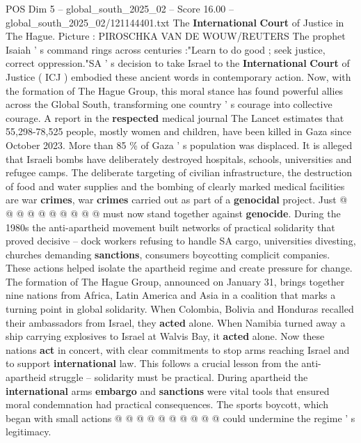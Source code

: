\begin{textsample}{POS Dim 5 – global\_south\_2025\_02 – Score 16.00 – global\_south\_2025\_02/121144401.txt}  \label{ex:f5_pos_148}
The \textbf{International} \textbf{Court} of Justice in The Hague.
Picture : PIROSCHKA VAN DE WOUW/REUTERS The prophet Isaiah ' s command rings across centuries :"Learn to do good ; seek justice, correct oppression."SA ' s decision to take Israel to the \textbf{International} \textbf{Court} of Justice ( ICJ ) embodied these ancient words in contemporary action.
Now, with the formation of The Hague Group, this moral stance has found powerful allies across the Global South, transforming one country ' s courage into collective courage.
A report in the \textbf{respected} medical journal The Lancet estimates that 55,298-78,525 people, mostly women and children, have been killed in Gaza since October 2023.
More than 85 \% of Gaza ' s population was displaced.
It is alleged that Israeli bombs have deliberately destroyed hospitals, schools, universities and refugee camps.
The deliberate targeting of civilian infrastructure, the destruction of food and water supplies and the bombing of clearly marked medical facilities are war \textbf{crimes}, war \textbf{crimes} carried out as part of a \textbf{genocidal} project.
Just @ @ @ @ @ @ @ @ @ @ must now stand together against \textbf{genocide}.
During the 1980s the anti-apartheid movement built networks of practical solidarity that proved decisive -- dock workers refusing to handle SA cargo, universities divesting, churches demanding \textbf{sanctions}, consumers boycotting complicit companies.
These actions helped isolate the apartheid regime and create pressure for change.
The formation of The Hague Group, announced on January 31, brings together nine nations from Africa, Latin America and Asia in a coalition that marks a turning point in global solidarity.
When Colombia, Bolivia and Honduras recalled their ambassadors from Israel, they \textbf{acted} alone.
When Namibia turned away a ship carrying explosives to Israel at Walvis Bay, it \textbf{acted} alone.
Now these nations \textbf{act} in concert, with clear commitments to stop arms reaching Israel and to support \textbf{international} law.
This follows a crucial lesson from the anti-apartheid struggle -- solidarity must be practical.
During apartheid the \textbf{international} arms \textbf{embargo} and \textbf{sanctions} were vital tools that ensured moral condemnation had practical consequences.
The sports boycott, which began with small actions @ @ @ @ @ @ @ @ @ @ could undermine the regime ' s legitimacy.

\end{textsample}
